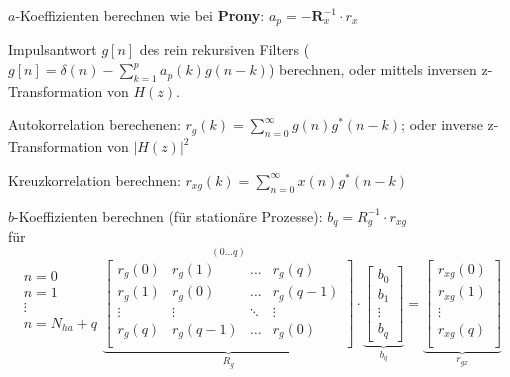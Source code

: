 \begin{aufzaehlung}
  		\item $a$-Koeffizienten berechnen wie bei \textbf{Prony}: $a_p = - \bm R_x^{-1} \cdot r_x$   
  		\item Impulsantwort $g[n]$ des rein rekursiven Filters ($g[n] = \delta(n)- \sum\limits_{k=1}^p a_p(k)g(n-k)$) berechnen, 
  		oder mittels inversen z-Transformation von $H(z)$.
  		\item Autokorrelation berechenen:  $r_g(k)=\sum\limits_{n=0}^\infty g(n)g^*(n-k)$; oder inverse z-Transformation von $|H(z)|^2$
  		\item Kreuzkorrelation berechnen: $r_{xg}(k)=\sum\limits_{n=0}^\infty x(n)g^*(n-k)$
  		\item $b$-Koeffizienten berechnen (für stationäre Prozesse): $b_q = R_g^{-1} \cdot r_{xg}$ \\
  		für\\
  		
			
		 $$\begin{matrix}n=0\\ n=1\\ \vdots\\ n=N_{ha}+q\\ \end{matrix}
		\overset{(0 \hdots q)}{\underbrace{\begin{bmatrix}
    		r_g(0) & r_g(1) & \hdots & r_g(q) \\                                            
    		r_g(1) & r_g(0) & \hdots & r_g(q-1) \\         
    		\vdots & \vdots & \ddots & \vdots \\                                      
    		r_g(q) &r_g(q-1) & \hdots & r_g(0) \\    
		\end{bmatrix}  }_{R_g}} \cdot \underbrace{\begin{bmatrix}
    		b_0 \\
    		b_1 \\
    		\vdots \\
    		b_q
		\end{bmatrix}  }_{b_q}= \underbrace{\begin{bmatrix}
    		r_{xg}(0) \\
    		r_{xg}(1) \\
    		\vdots \\
    		r_{xg}(q) \\
		\end{bmatrix}  }_{r_{gx}} $$
\end{aufzaehlung}

